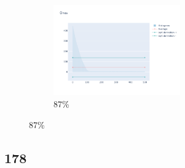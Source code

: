 \documentclass[12pt, fleqn]{report}                             %
\theoremstyle{break}                                            %
\begin{document}
\begin{figure}[ht!]
\begin{subfigure}[b]{0.4\linewidth}
          \includegraphics[width=0.6\textwidth]{Images/172/dia-d.png}
          \caption{87\%}
        \end{subfigure}
      \end{figure}


      \clearpage
      \subsection{178}
\end{document}
